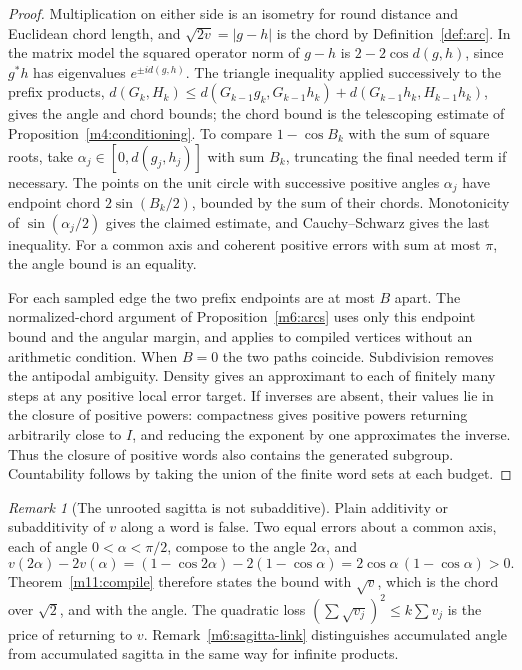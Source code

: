 \documentclass[11pt,reqno]{amsart}
\theoremstyle{definition}
\theoremstyle{remark}
\newtheorem{remark}[theorem]{Remark}
\numberwithin{equation}{section}
\begin{document}
\begin{proof}
Multiplication on either side is an isometry for round distance and
Euclidean chord length, and $\sqrt{2v}=|g-h|$ is the chord by
Definition~\ref{def:arc}. In the matrix model the squared operator norm
of $g-h$ is $2-2\cos d(g,h)$, since $g^*h$ has eigenvalues
$e^{\pm id(g,h)}$. The triangle inequality applied successively to
the prefix products, $d(G_k,H_k)\le d(G_{k-1}g_k,G_{k-1}h_k)+d(G_{k-1}h_k,H_{k-1}h_k)$,
gives the angle and chord bounds; the chord bound is the telescoping
estimate of Proposition~\ref{m4:conditioning}.
To compare $1-\cos B_k$ with the sum of square roots, take
$\alpha_j\in[0,d(g_j,h_j)]$ with sum $B_k$, truncating the final
needed term if necessary. The points on the unit circle with
successive positive angles $\alpha_j$ have endpoint chord
$2\sin(B_k/2)$, bounded by the sum of their chords. Monotonicity
of $\sin(\alpha_j/2)$ gives the claimed estimate, and
Cauchy--Schwarz gives the last inequality. For a common axis and
coherent positive errors with sum at most $\pi$, the angle bound is
an equality.

For each sampled edge the two prefix endpoints are at most $B$
apart. The normalized-chord argument of Proposition~\ref{m6:arcs}
uses only this endpoint bound and the angular margin, and applies to
compiled vertices without an arithmetic condition. When $B=0$ the
two paths coincide. Subdivision removes the antipodal ambiguity.
Density gives an approximant to each of finitely many steps at any
positive local error target. If inverses are absent, their values
lie in the closure of positive powers: compactness gives positive
powers returning arbitrarily close to $I$, and reducing the exponent
by one approximates the inverse. Thus the closure of positive words
also contains the generated subgroup. Countability follows by taking
the union of the finite word sets at each budget.
\end{proof}

\begin{remark}[The unrooted sagitta is not subadditive]\label{m11:sagitta-refuted}
Plain additivity or subadditivity of $v$ along a word is false. Two equal
errors about a common axis, each of angle $0<\alpha<\pi/2$, compose to the
angle $2\alpha$, and
\[
 v(2\alpha)-2v(\alpha)=(1-\cos2\alpha)-2(1-\cos\alpha)=2\cos\alpha\,(1-\cos\alpha)>0 .
\]
Theorem~\ref{m11:compile} therefore states the bound with $\sqrt v$, which
is the chord over $\sqrt2$, and with the angle. The quadratic loss
$(\sum\sqrt{v_j})^2\le k\sum v_j$ is the price of returning to $v$.
Remark~\ref{m6:sagitta-link} distinguishes accumulated angle from
accumulated sagitta in the same way for infinite products.
\end{remark}
\end{document}
